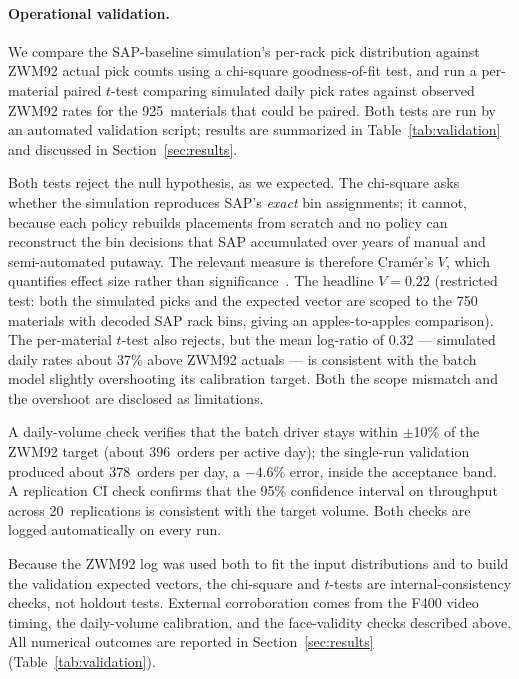 \paragraph{Operational validation.}
We compare the SAP-baseline simulation's per-rack pick distribution against
ZWM92 actual pick counts using a chi-square goodness-of-fit test, and run a
per-material paired $t$-test comparing simulated daily pick rates against
observed ZWM92 rates for the 925~materials that could be paired. Both tests
are run by an automated validation script; results are summarized in
Table~\ref{tab:validation} and discussed in Section~\ref{sec:results}.

Both tests reject the null hypothesis, as we expected. The chi-square asks
whether the simulation reproduces SAP's \emph{exact} bin assignments; it
cannot, because each policy rebuilds placements from scratch and no policy
can reconstruct the bin decisions that SAP accumulated over years of manual
and semi-automated putaway. The relevant measure is therefore Cram\'{e}r's
$V$, which quantifies effect size rather than significance~\cite{sargent2013}.
The headline $V = 0.22$ (restricted test: both the simulated picks and the
expected vector are scoped to the 750 materials with decoded SAP rack bins,
giving an apples-to-apples comparison). The per-material $t$-test also
rejects, but the mean log-ratio of 0.32 --- simulated daily rates about 37\%
above ZWM92 actuals --- is consistent with the batch model slightly
overshooting its calibration target. Both the scope mismatch and the
overshoot are disclosed as limitations.

A daily-volume check verifies that the batch driver stays within
$\pm$10\% of the ZWM92 target (about 396~orders per active day); the
single-run validation produced about 378~orders per day, a $-4.6\%$ error,
inside the acceptance band. A replication CI check confirms that the 95\%
confidence interval on throughput across 20~replications is consistent with
the target volume. Both checks are logged automatically on every run.

Because the ZWM92 log was used both to fit the input distributions and to
build the validation expected vectors, the chi-square and $t$-tests are
internal-consistency checks, not holdout tests. External corroboration comes
from the F400 video timing, the daily-volume calibration, and the face-validity
checks described above. All numerical outcomes are reported in
Section~\ref{sec:results} (Table~\ref{tab:validation}).


